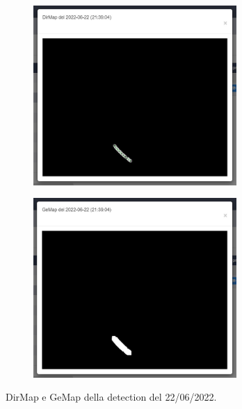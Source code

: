 \begin{figure}[H]
    \begin{subfigure}{\textwidth}
        \begin{center}
        \includegraphics[width=0.85\textwidth]{images/dirmap.jpg}
        \end{center}
    \end{subfigure}
    \begin{subfigure}{\textwidth}
        \begin{center}
        \includegraphics[width=0.85\textwidth]{images/gemap.jpg}
        \end{center}
    \end{subfigure}
    \caption{DirMap e GeMap della detection del 22/06/2022.}
\end{figure}


